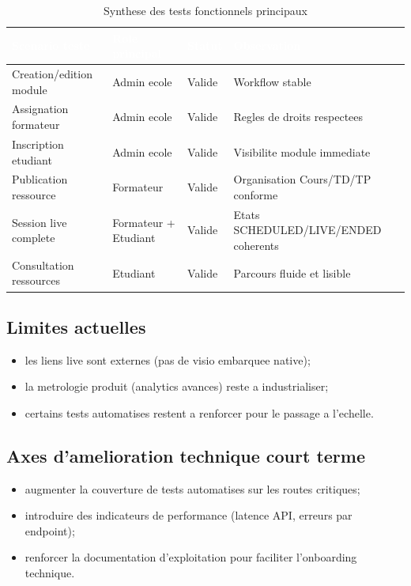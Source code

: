 ﻿\documentclass[12pt,a4paper,oneside]{report}
\begin{document}
\renewcommand{\arraystretch}{1.3}
\begin{table}[H]
\centering
\caption{Synthese des tests fonctionnels principaux}
\label{tab:tests_ch3}
\begin{tabular}{|p{4.3cm}|p{3.2cm}|p{2.4cm}|p{2.6cm}|}
\hline
\rowcolor{ustoblue}
\textcolor{white}{Scenario teste} &
\textcolor{white}{Role principal} &
\textcolor{white}{Statut} &
\textcolor{white}{Observation} \\
\hline
Creation/edition module & Admin ecole & Valide & Workflow stable \\
\hline
Assignation formateur & Admin ecole & Valide & Regles de droits respectees \\
\hline
Inscription etudiant & Admin ecole & Valide & Visibilite module immediate \\
\hline
Publication ressource & Formateur & Valide & Organisation Cours/TD/TP conforme \\
\hline
Session live complete & Formateur + Etudiant & Valide & Etats SCHEDULED/LIVE/ENDED coherents \\
\hline
Consultation ressources & Etudiant & Valide & Parcours fluide et lisible \\
\hline
\end{tabular}
\end{table}

\subsection{Limites actuelles}

\begin{itemize}
  \item les liens live sont externes (pas de visio embarquee native);
  \item la metrologie produit (analytics avances) reste a industrialiser;
  \item certains tests automatises restent a renforcer pour le passage a l'echelle.
\end{itemize}

\subsection{Axes d'amelioration technique court terme}

\begin{itemize}
  \item augmenter la couverture de tests automatises sur les routes critiques;
  \item introduire des indicateurs de performance (latence API, erreurs par endpoint);
  \item renforcer la documentation d'exploitation pour faciliter l'onboarding technique.
\end{itemize}
\end{document}
